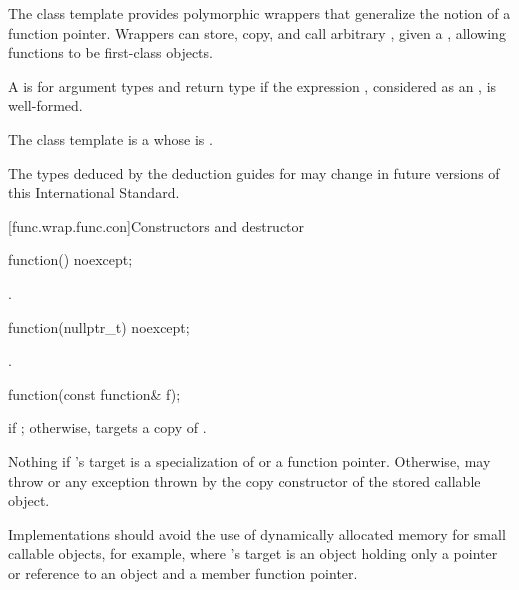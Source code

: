 \pnum
The  class template provides polymorphic wrappers that
generalize the notion of a function pointer. Wrappers can store, copy,
and call arbitrary , given a
, allowing functions to be first-class objects.

\pnum
{}%
A  
is  for argument
types 
and return type 
if the expression
,
considered as an , is
well-formed.

\pnum
The  class template is a
 whose 
is .

\pnum
\begin{note}
The types deduced by the deduction guides for 
may change in future versions of this International Standard.
\end{note}

[func.wrap.func.con]{Constructors and destructor}

%
\begin{itemdecl}
function() noexcept;
\end{itemdecl}

\begin{itemdescr}
\pnum
\ensures
{}.
\end{itemdescr}

%
\begin{itemdecl}
function(nullptr_t) noexcept;
\end{itemdecl}

\begin{itemdescr}
\pnum
\ensures
{}.
\end{itemdescr}

%
\begin{itemdecl}
function(const function& f);
\end{itemdecl}

\begin{itemdescr}
\pnum
\ensures
{} if ; otherwise,
 targets a copy of .

\pnum
\throws
Nothing if 's target is
a specialization of  or
a function pointer. Otherwise, may throw 
or any exception thrown by the copy constructor of the stored callable object.
\begin{note}
Implementations should avoid the use of
dynamically allocated memory for small callable objects, for example, where
's target is an object holding only a pointer or reference
to an object and a member function pointer.
\end{note}
\end{itemdescr}

